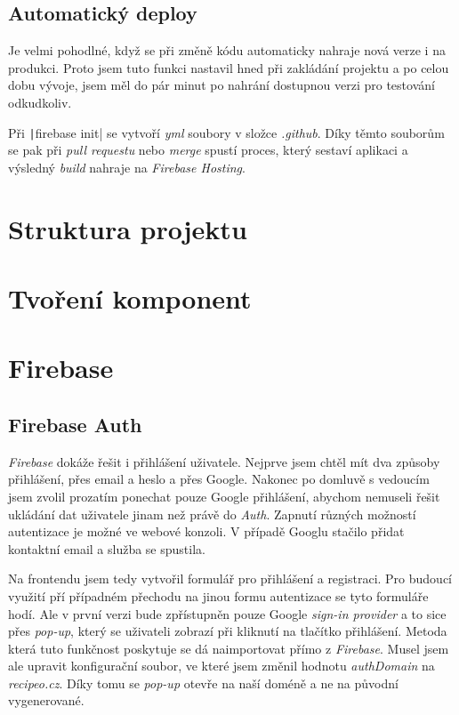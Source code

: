\subsection{Automatický deploy}
Je velmi pohodlné, když se při změně kódu automaticky nahraje nová verze i na produkci. Proto jsem tuto funkci nastavil hned
při zakládání projektu a po celou dobu vývoje, jsem měl do pár minut po nahrání dostupnou verzi pro testování odkudkoliv.

Při \texttt|firebase init| se vytvoří \emph{yml} soubory v složce \emph{.github}. Díky těmto souborům se pak při
\emph{pull requestu} nebo \emph{merge} spustí proces, který sestaví aplikaci a výsledný \emph{build} nahraje na \emph{Firebase Hosting}.


\section{Struktura projektu}

\section{Tvoření komponent}

\section{Firebase}

\subsection{Firebase Auth}
\emph{Firebase} dokáže řešit i přihlášení uživatele. Nejprve jsem chtěl mít dva způsoby přihlášení, přes email a heslo a přes
Google. Nakonec po domluvě s vedoucím jsem zvolil prozatím ponechat pouze Google přihlášení, abychom nemuseli řešit ukládání
dat uživatele jinam než právě do \emph{Auth}. Zapnutí různých možností autentizace je možné ve webové konzoli. V případě Googlu
stačilo přidat kontaktní email a služba se spustila.

Na frontendu jsem tedy vytvořil formulář pro přihlášení a registraci. Pro budoucí využití pří případném přechodu na jinou formu
autentizace se tyto formuláře hodí. Ale v první verzi bude zpřístupněn pouze Google \emph{sign-in provider} a to sice přes \emph{pop-up},
který se uživateli zobrazí při kliknutí na tlačítko přihlášení. Metoda která tuto funkčnost poskytuje se dá naimportovat přímo
z \emph{Firebase}. Musel jsem ale upravit konfigurační soubor, ve které jsem změnil hodnotu \emph{authDomain} na \emph{recipeo.cz}.
Díky tomu se \emph{pop-up} otevře na naší doméně a ne na původní vygenerované.

